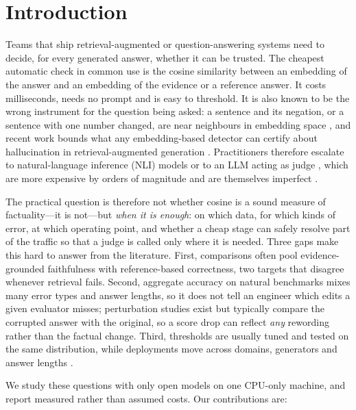 \section{Introduction}
\label{sec:intro}

Teams that ship retrieval-augmented or question-answering systems need to decide, for every generated answer, whether it can be trusted. The cheapest automatic check in common use is the cosine similarity between an embedding of the answer and an embedding of the evidence or a reference answer. It costs milliseconds, needs no prompt and is easy to threshold. It is also known to be the wrong instrument for the question being asked: a sentence and its negation, or a sentence with one number changed, are near neighbours in embedding space \citep{anschutz2023correct,cao2025semantic,steck2024cosine}, and recent work bounds what any embedding-based detector can certify about hallucination in retrieval-augmented generation \citep{sinha2025semantic}. Practitioners therefore escalate to natural-language inference (NLI) models or to an LLM acting as judge \citep{liu2023geval,zheng2023judging}, which are more expensive by orders of magnitude and are themselves imperfect \citep{godbole2025verify}.

The practical question is therefore not whether cosine is a sound measure of factuality---it is not---but \emph{when it is enough}: on which data, for which kinds of error, at which operating point, and whether a cheap stage can safely resolve part of the traffic so that a judge is called only where it is needed. Three gaps make this hard to answer from the literature. First, comparisons often pool evidence-grounded faithfulness with reference-based correctness, two targets that disagree whenever retrieval fails. Second, aggregate accuracy on natural benchmarks mixes many error types and answer lengths, so it does not tell an engineer which edits a given evaluator misses; perturbation studies exist \citep{gharsallah2026trust,nguyen2026accuracy} but typically compare the corrupted answer with the original, so a score drop can reflect \emph{any} rewording rather than the factual change. Third, thresholds are usually tuned and tested on the same distribution, while deployments move across domains, generators and answer lengths \citep{dubanowska2025representation}.

We study these questions with only open models on one CPU-only machine, and report measured rather than assumed costs. Our contributions are:

